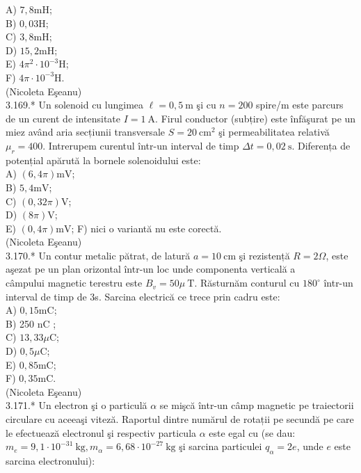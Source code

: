 \documentclass[10pt]{article}
\begin{document}
A) $7,8 \mathrm{mH}$;\\
B) $0,03 \mathrm{H}$;\\
C) $3,8 \mathrm{mH}$;\\
D) $15,2 \mathrm{mH}$;\\
E) $4 \pi^{2} \cdot 10^{-3} \mathrm{H}$;\\
F) $4 \pi \cdot 10^{-3} \mathrm{H}$.\\
(Nicoleta Eşeanu)\\
3.169.* Un solenoid cu lungimea $\ell=0,5 \mathrm{~m}$ şi cu $n=200$ spire/m este parcurs de un curent de intensitate $I=1 \mathrm{~A}$. Firul conductor (subțire) este înfăşurat pe un miez având aria secțiunii transversale $S=20 \mathrm{~cm}^{2}$ şi permeabilitatea relativă $\mu_{r}=400$. Intrerupem curentul într-un interval de timp $\Delta t=0,02 \mathrm{~s}$. Diferența de potențial apărută la bornele solenoidului este:\\
A) $(6,4 \pi) \mathrm{mV}$;\\
B) $5,4 \mathrm{mV}$;\\
C) $(0,32 \pi) \mathrm{V}$;\\
D) $(8 \pi) \mathrm{V}$;\\
E) $(0,4 \pi) \mathrm{mV}$; F) nici o variantă nu este corectă.\\
(Nicoleta Eşeanu)\\
3.170.* Un contur metalic pătrat, de latură $a=10 \mathrm{~cm}$ şi rezistență $R=2 \Omega$, este aşezat pe un plan orizontal într-un loc unde componenta verticală a\\
câmpului magnetic terestru este $B_{v}=50 \mu \mathrm{~T}$. Răsturnăm conturul cu $180^{\circ}$ într-un interval de timp de 3s. Sarcina electrică ce trece prin cadru este:\\
A) $0,15 \mathrm{mC}$;\\
B) 250 nC ;\\
C) $13,33 \mu \mathrm{C}$;\\
D) $0,5 \mu \mathrm{C}$;\\
E) $0,85 \mathrm{mC}$;\\
F) $0,35 \mathrm{mC}$.\\
(Nicoleta Eşeanu)\\
3.171.* Un electron şi o particulă $\alpha$ se mişcă într-un câmp magnetic pe traiectorii circulare cu aceeaşi viteză. Raportul dintre numărul de rotații pe secundă pe care le efectuează electronul şi respectiv particula $\alpha$ este egal cu (se dau: $m_{e}=9,1 \cdot 10^{-31} \mathrm{~kg}, m_{\alpha}=6,68 \cdot 10^{-27} \mathrm{~kg}$ şi sarcina particulei $q_{\alpha}=2 e$, unde $e$ este sarcina electronului):\\
\end{document}
